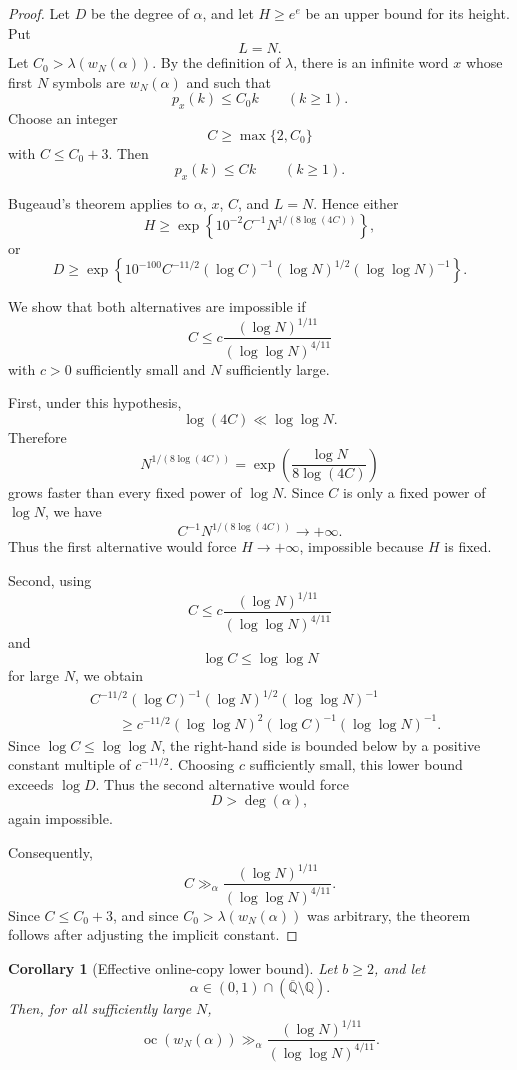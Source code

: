 \documentclass[11pt]{amsart}
\newtheorem{corollary}[theorem]{Corollary}
\theoremstyle{definition}
\DeclareMathOperator{\oc}{oc}
\begin{document}
\begin{proof}
Let \(D\) be the degree of \(\alpha\), and let \(H\geq e^e\) be an upper bound for its height. Put
\[
L=N.
\]
Let \(C_0>\lambda(w_N(\alpha))\). By the definition of \(\lambda\), there is an infinite word \(x\) whose first \(N\) symbols are \(w_N(\alpha)\) and such that
\[
p_x(k)\leq C_0 k
\qquad(k\geq 1).
\]
Choose an integer
\[
C\geq \max\{2,C_0\}
\]
with \(C\leq C_0+3\). Then
\[
p_x(k)\leq Ck
\qquad(k\geq 1).
\]

Bugeaud's theorem applies to \(\alpha\), \(x\), \(C\), and \(L=N\). Hence either
\[
H
\geq
\exp\left\{
10^{-2}C^{-1}N^{1/(8\log(4C))}
\right\},
\]
or
\[
D
\geq
\exp\left\{
10^{-100}C^{-11/2}(\log C)^{-1}
(\log N)^{1/2}(\log\log N)^{-1}
\right\}.
\]

We show that both alternatives are impossible if
\[
C\leq c
\frac{(\log N)^{1/11}}{(\log\log N)^{4/11}}
\]
with \(c>0\) sufficiently small and \(N\) sufficiently large.

First, under this hypothesis,
\[
\log(4C)\ll \log\log N.
\]
Therefore
\[
N^{1/(8\log(4C))}
=
\exp\left(\frac{\log N}{8\log(4C)}\right)
\]
grows faster than every fixed power of \(\log N\). Since \(C\) is only a fixed power of \(\log N\), we have
\[
C^{-1}N^{1/(8\log(4C))}\to +\infty.
\]
Thus the first alternative would force \(H\to +\infty\), impossible because \(H\) is fixed.

Second, using
\[
C\leq c
\frac{(\log N)^{1/11}}{(\log\log N)^{4/11}}
\]
and
\[
\log C\leq \log\log N
\]
for large \(N\), we obtain
\begin{align*}
&C^{-11/2}(\log C)^{-1}
(\log N)^{1/2}(\log\log N)^{-1} \\
&\qquad\geq
c^{-11/2}(\log\log N)^2
(\log C)^{-1}(\log\log N)^{-1}.
\end{align*}
Since \(\log C\leq \log\log N\), the right-hand side is bounded below by a positive constant multiple of \(c^{-11/2}\). Choosing \(c\) sufficiently small, this lower bound exceeds \(\log D\). Thus the second alternative would force
\[
D>\deg(\alpha),
\]
again impossible.

Consequently,
\[
C
\gg_{\alpha}
\frac{(\log N)^{1/11}}{(\log\log N)^{4/11}}.
\]
Since \(C\leq C_0+3\), and since \(C_0>\lambda(w_N(\alpha))\) was arbitrary, the theorem follows after adjusting the implicit constant.
\end{proof}

\begin{corollary}[Effective online-copy lower bound]
Let \(b\geq 2\), and let
\[
\alpha\in(0,1)\cap(\overline{\mathbb Q}\setminus\mathbb Q).
\]
Then, for all sufficiently large \(N\),
\[
\oc(w_N(\alpha))
\gg_{\alpha}
\frac{(\log N)^{1/11}}{(\log\log N)^{4/11}}.
\]
\end{corollary}
\end{document}
